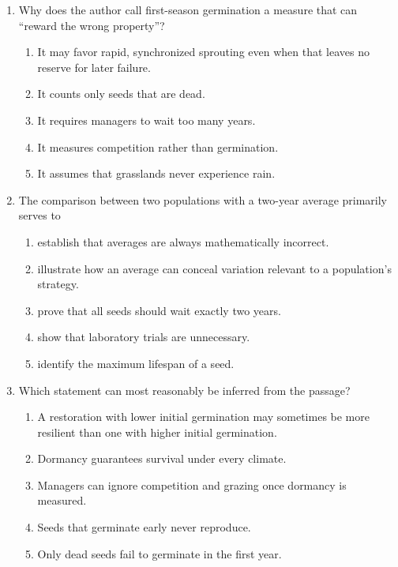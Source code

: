 \begin{enumerate}
\item Why does the author call first-season germination a measure that can ``reward the wrong property''?
\begin{enumerate}
\item[(A)] It may favor rapid, synchronized sprouting even when that leaves no reserve for later failure.
\item[(B)] It counts only seeds that are dead.
\item[(C)] It requires managers to wait too many years.
\item[(D)] It measures competition rather than germination.
\item[(E)] It assumes that grasslands never experience rain.
\end{enumerate}

\item The comparison between two populations with a two-year average primarily serves to
\begin{enumerate}
\item[(A)] establish that averages are always mathematically incorrect.
\item[(B)] illustrate how an average can conceal variation relevant to a population's strategy.
\item[(C)] prove that all seeds should wait exactly two years.
\item[(D)] show that laboratory trials are unnecessary.
\item[(E)] identify the maximum lifespan of a seed.
\end{enumerate}

\item Which statement can most reasonably be inferred from the passage?
\begin{enumerate}
\item[(A)] A restoration with lower initial germination may sometimes be more resilient than one with higher initial germination.
\item[(B)] Dormancy guarantees survival under every climate.
\item[(C)] Managers can ignore competition and grazing once dormancy is measured.
\item[(D)] Seeds that germinate early never reproduce.
\item[(E)] Only dead seeds fail to germinate in the first year.
\end{enumerate}

\end{enumerate}

